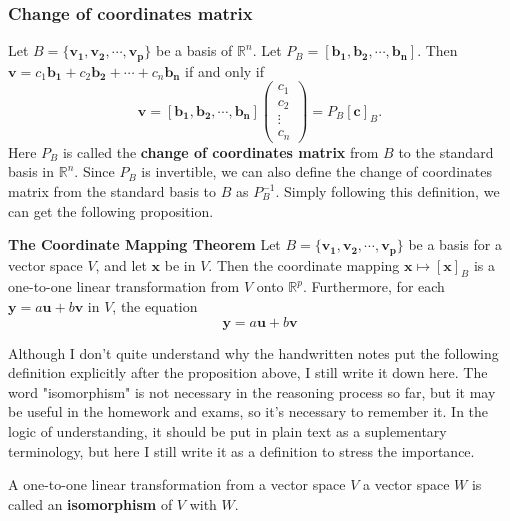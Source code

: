 \documentclass[10pt, a4paper]{article}
\newcommand{\R}{\mathbb{R}}
\newcommand{\vt}[1]{\mathbf{#1}}
\begin{document}
\subsubsection*{Change of coordinates matrix}
Let $B=\{\vt{v_1}, \vt{v_2}, \cdots, \vt{v_p}\}$ be a basis of $\R^n$. Let $P_B = [\vt{b_1}, \vt{b_2}, \cdots, \vt{b_n}]$. 
Then $\vt{v}=c_1\vt{b_1}+c_2\vt{b_2}+\cdots+c_n\vt{b_n}$ if and only if \[
\vt{v}=[\vt{b_1}, \vt{b_2}, \cdots, \vt{b_n}]\begin{pmatrix}
    c_1\\c_2\\\vdots\\c_n
\end{pmatrix} = P_B[\vt{c}]_B.
\]
Here $P_B$ is called the \textbf{change of coordinates matrix} from $B$ to the standard basis in $\R^n$. 
Since $P_B$ is invertible, we can also define the change of coordinates matrix from the standard basis to $B$ as $P_B^{-1}$.
Simply following this definition, we can get the following proposition.
\begin{proposition}
    \textbf{The Coordinate Mapping Theorem} 
    Let $B=\{\vt{v_1}, \vt{v_2}, \cdots, \vt{v_p}\}$ be a basis for a vector space $V$, and let $\vt{x}$ be in $V$. Then the coordinate mapping $\vt{x}\mapsto [\vt{x}]_B$ is a one-to-one linear transformation from $V$ onto $\R^p$. Furthermore, for each $\vt{y}=a\vt{u}+b\vt{v}$ in $V$, the equation \[
    \vt{y} = a\vt{u}+b\vt{v}
    \]
\end{proposition}
Although I don't quite understand why the handwritten notes put the following definition explicitly after the proposition above, I still write it down here. The word "isomorphism" is not necessary in the reasoning process so far, but it may be useful in the homework and exams, so it's necessary to remember it.
In the logic of understanding, it should be put in plain text as a suplementary terminology, but here I still write it as a definition to stress the importance.
\begin{definition}
    A one-to-one linear transformation from a vector space $V$ a vector space $W$ is called an \textbf{isomorphism} of $V$ with $W$. 
\end{definition}
\end{document}
